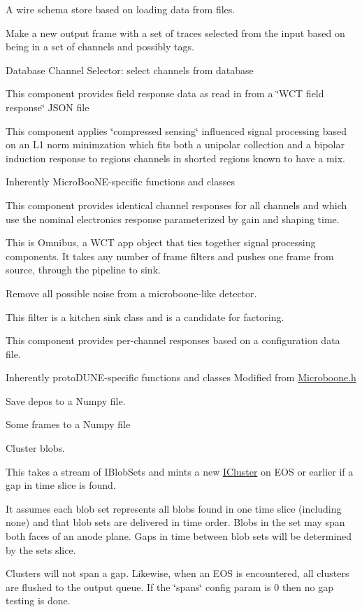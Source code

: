 A wire schema store based on loading data from files.

Make a new output frame with a set of traces selected from the input based on being in a set of channels and possibly tags.

Database Channel Selector\+: select channels from database

This component provides field response data as read in from a \char`\"{}\+W\+C\+T
field response\char`\"{} J\+S\+ON file

This component applies \char`\"{}compressed sensing\char`\"{} influenced signal processing based on an L1 norm minimzation which fits both a unipolar collection and a bipolar induction response to regions channels in shorted regions known to have a mix.

Inherently Micro\+Boo\+N\+E-\/specific functions and classes

This component provides identical channel responses for all channels and which use the nominal electronics response parameterized by gain and shaping time.

This is Omnibus, a W\+CT app object that ties together signal processing components. It takes any number of frame filters and pushes one frame from source, through the pipeline to sink.

Remove all possible noise from a microboone-\/like detector.

This filter is a kitchen sink class and is a candidate for factoring.

This component provides per-\/channel responses based on a configuration data file.

Inherently proto\+D\+U\+N\+E-\/specific functions and classes Modified from \hyperlink{_microboone_8h}{Microboone.\+h}

Save depos to a Numpy file.

Some frames to a Numpy file

Cluster blobs.

This takes a stream of I\+Blob\+Sets and mints a new \hyperlink{class_wire_cell_1_1_i_cluster}{I\+Cluster} on E\+OS or earlier if a gap in time slice is found.

It assumes each blob set represents all blobs found in one time slice (including none) and that blob sets are delivered in time order. Blobs in the set may span both faces of an anode plane. Gaps in time between blob sets will be determined by the set\textquotesingle{}s slice.

Clusters will not span a gap. Likewise, when an E\+OS is encountered, all clusters are flushed to the output queue. If the \char`\"{}spans\char`\"{} config param is 0 then no gap testing is done.

